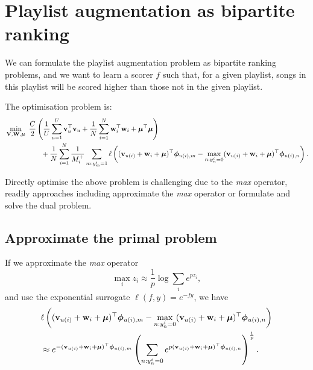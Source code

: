 \section{Playlist augmentation as bipartite ranking}

We can formulate the playlist augmentation problem as bipartite ranking problems, 
and we want to learn a scorer $f$ such that, for a given playlist, 
songs in this playlist will be scored higher than those not in the given playlist.

The optimisation problem is:
\begin{equation}
\label{eq:primal_pla}
\begin{aligned}
&\min_{\mathbf{V}, \mathbf{W}, \bm{\mu}} \ \frac{C}{2} \left( \frac{1}{U} \sum_{u=1}^U \mathbf{v}_u^\top \mathbf{v}_u 
     + \frac{1}{N} \sum_{i=1}^N \mathbf{w}_i^\top \mathbf{w}_i + \bm{\mu}^\top \bm{\mu} \right) \\
& \hspace{5em}
     + \frac{1}{N} \sum_{i=1}^N \frac{1}{M_i^+} \sum_{m: y_m^i = 1} \ell \left( (\mathbf{v}_{u(i)} + \mathbf{w}_i + \bm{\mu})^\top \bm{\phi}_{u(i),m}
     - \max_{n: y_n^i = 0} (\mathbf{v}_{u(i)} + \mathbf{w}_i + \bm{\mu})^\top \bm{\phi}_{u(i),n} \right).
\end{aligned}
\end{equation}

Directly optimise the above problem is challenging due to the \emph{max} operator,
readily approaches including approximate the \emph{max} operator or formulate and solve the dual problem.


\subsection{Approximate the primal problem}
If we approximate the \emph{max} operator
\begin{equation*}
\max_i z_i \approx \frac{1}{p} \log \sum_i e^{p z_i},
\end{equation*}
and use the exponential surrogate $\ell(f, y) = e^{-fy}$, we have
\begin{equation*}
\begin{aligned}
&\ell \left( (\mathbf{v}_{u(i)} + \mathbf{w}_i + \bm{\mu})^\top \bm{\phi}_{u(i),m} - \max_{n: y_n^i = 0} (\mathbf{v}_{u(i)} + \mathbf{w}_i + \bm{\mu})^\top \bm{\phi}_{u(i),n} \right) \\
&\approx e^{-(\mathbf{v}_{u(i)} + \mathbf{w}_i + \bm{\mu})^\top \bm{\phi}_{u(i),m}}
   \left( \sum_{n: y_n^i = 0} e^{p (\mathbf{v}_{u(i)} + \mathbf{w}_i + \bm{\mu})^\top \bm{\phi}_{u(i),n}} \right)^\frac{1}{p}.
\end{aligned}
\end{equation*}

